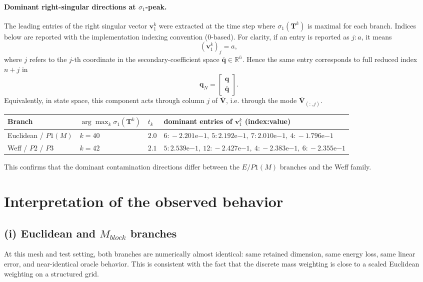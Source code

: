 \documentclass[11pt]{article}
\begin{document}
\paragraph{Dominant right-singular directions at \(\sigma_1\)-peak.}
The leading entries of the right singular vector \(\mathbf v_1^k\) were extracted at the time step where \(\sigma_1(\mathbf T^k)\) is maximal for each branch.
Indices below are reported with the implementation indexing convention (0-based).
For clarity, if an entry is reported as \(j:a\), it means
\[
(\mathbf v_1^k)_j=a,
\]
where \(j\) refers to the \(j\)-th coordinate in the secondary-coefficient space
\(\bar{\mathbf q}\in\mathbb R^{\bar n}\).
Hence the same entry corresponds to full reduced index \(n+j\) in
\[
\mathbf q_N=
\begin{bmatrix}
\mathbf q\\
\bar{\mathbf q}
\end{bmatrix}.
\]
Equivalently, in state space, this component acts through column \(j\) of
\(\overline{\mathbf V}\), i.e. through the mode \(\overline{\mathbf V}_{(:,j)}\).
\begin{longtable}{lllp{}}
\toprule
Branch & \(\arg\max_k \sigma_1(\mathbf T^k)\) & \(t_k\) & dominant entries of \(\mathbf v_1^k\) (index:value) \\
\midrule
Euclidean / \(P1(M)\) & \(k=40\) & \(2.0\) &
\(6\!:\!-2.201\mathrm{e}{-1},\ 5\!:\!2.192\mathrm{e}{-1},\ 7\!:\!2.010\mathrm{e}{-1},\ 4\!:\!-1.796\mathrm{e}{-1}\) \\
Weff / \(P2\) / \(P3\) & \(k=42\) & \(2.1\) &
\(5\!:\!2.539\mathrm{e}{-1},\ 12\!:\!-2.427\mathrm{e}{-1},\ 4\!:\!-2.383\mathrm{e}{-1},\ 6\!:\!-2.355\mathrm{e}{-1}\) \\
\bottomrule
\end{longtable}
This confirms that the dominant contamination directions differ between
the \(E/P1(M)\) branches and the Weff family.

\section{Interpretation of the observed behavior}
\subsection*{(i) Euclidean and \(M_{block}\) branches}
At this mesh and test setting, both branches are numerically almost identical: same retained dimension, same energy loss, same linear error, and near-identical oracle behavior.
This is consistent with the fact that the discrete mass weighting is close to a scaled Euclidean weighting on a structured grid.
\end{document}
